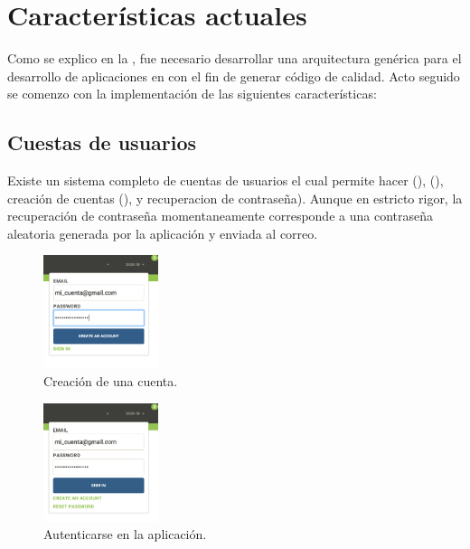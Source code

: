 \section{Características actuales}

Como se explico en la , fue necesario desarrollar una arquitectura genérica para el desarrollo de aplicaciones en \meteorNAME con el fin de generar código de calidad. Acto seguido se comenzo con la implementación de las siguientes características:

\subsection{Cuestas de usuarios}
 
Existe un sistema completo de cuentas de usuarios el cual permite hacer \loginCPT(), \logoutCPT(), creación de cuentas (), y recuperacion de contraseña). Aunque en estricto rigor, la recuperación de contraseña momentaneamente corresponde a una contraseña aleatoria generada por la aplicación y enviada al correo.


\begin{figure}[H]
	\centering
	\includegraphics[width=0.3\textwidth]{figuras/accounts/create_account.png}

	\caption{Creación de una cuenta.}
	\label{figure:account:create_account}
\end{figure}

\begin{figure}[H]
	\centering
	\includegraphics[width=0.3\textwidth]{figuras/accounts/sign_in_ui.png}

	\caption{Autenticarse en la aplicación.}
	\label{figure:account:sign_in_ui}
\end{figure}


